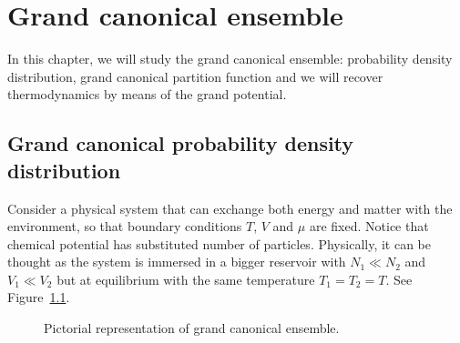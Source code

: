 \chapter{Grand canonical ensemble}

    In this chapter, we will study the grand canonical ensemble: probability density distribution, grand canonical partition function and we will recover thermodynamics by means of the grand potential.

\section{Grand canonical probability density distribution}

    Consider a physical system that can exchange both energy and matter with the environment, so that boundary conditions $T$, $V$ and $\mu$ are fixed. Notice that chemical potential has substituted number of particles. Physically, it can be thought as the system is immersed in a bigger reservoir with $N_1 \ll N_2$ and $V_1 \ll V_2$ but at equilibrium with the same temperature $T_1 = T_2 = T$. See Figure~\ref{fig:gc}. 

    \begin{figure}[h!]
        \centering
        \label{fig:gc}
        \caption{Pictorial representation of grand canonical ensemble.}
    \end{figure}
    
